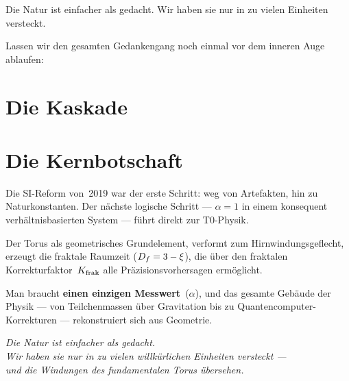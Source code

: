 \epigraph{Die Natur ist einfacher als gedacht. Wir haben sie nur in zu vielen Einheiten versteckt.}{}

Lassen wir den gesamten Gedankengang noch einmal vor dem inneren Auge ablaufen:

\section{Die Kaskade}

\begin{center}
\end{center}

\section{Die Kernbotschaft}

Die SI-Reform von~2019 war der erste Schritt: weg von Artefakten, hin zu Naturkonstanten. Der nächste logische Schritt --- $\alpha = 1$ in einem konsequent verhältnisbasierten System --- führt direkt zur T0-Physik.

Der Torus als geometrisches Grundelement, verformt zum Hirnwindungsgeflecht, erzeugt die fraktale Raumzeit ($D_f = 3 - \xi$), die über den fraktalen Korrekturfaktor~$K_{\text{frak}}$ alle Präzisionsvorhersagen ermöglicht.

Man braucht \textbf{einen einzigen Messwert}~($\alpha$), und das gesamte Gebäude der Physik --- von Teilchenmassen über Gravitation bis zu Quantencomputer-Korrekturen --- rekonstruiert sich aus Geometrie.

\vspace{1em}
\begin{center}
\large\itshape
Die Natur ist einfacher als gedacht.\\
Wir haben sie nur in zu vielen willkürlichen Einheiten versteckt ---\\
und die Windungen des fundamentalen Torus übersehen.
\end{center}
